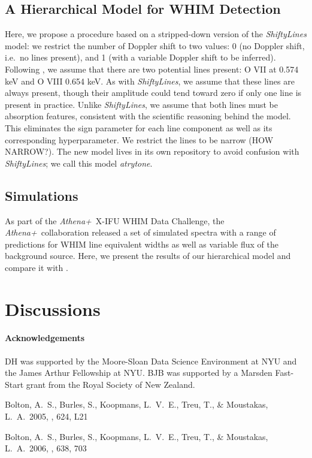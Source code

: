 \documentclass[12pt]{emulateapj}
\newcommand{\project}[1]{\textsl{#1}}
\newcommand{\athena}{\project{Athena+}}
\begin{document}
\subsection{A Hierarchical Model for WHIM Detection}

Here, we propose a procedure based on a stripped-down version of the \textit{ShiftyLines} model: we restrict the number of Doppler shift to two values: 0 (no Doppler shift, i.e.\ no lines present), and 1 (with a variable Doppler shift to be inferred). Following \citep{brand2016}, we assume that there are two potential lines present: O VII at 0.574 keV and O VIII 0.654 keV. As with \textit{ShiftyLines}, we assume that these lines are always present, though their amplitude could tend toward zero if only one line is present in practice. Unlike \textit{ShiftyLines}, we assume that both lines must be absorption features, consistent with the scientific reasoning behind the model. This eliminates the sign parameter for each line component as well as its corresponding hyperparameter. We restrict the lines to be narrow (HOW NARROW?). The new model lives in its own repository to avoid confusion with \textit{ShiftyLines}; we call this model \textit{atrytone}. 

\subsection{Simulations}

As part of the \athena\ X-IFU WHIM Data Challenge, the \athena\ collaboration released a set of simulated spectra with a range of predictions for WHIM line equivalent widths as well as variable flux of the background source. Here, we present the results of our hierarchical model and compare it with \citep{brand2016}.

\section{Discussions}



\paragraph{Acknowledgements}
DH was supported by the Moore-Sloan Data Science Environment at NYU and the James Arthur Fellowship at NYU.
BJB was supported by a Marsden Fast-Start grant from the Royal Society of
New Zealand.



\begin{thebibliography}{999}

 Bolton, A.~S., Burles, 
S., Koopmans, L.~V.~E., Treu, T., 
\& Moustakas, L.~A.\ 2005, \apjl, 624, L21 

 Bolton, A.~S., Burles, 
S., Koopmans, L.~V.~E., Treu, T., \& Moustakas, L.~A.\ 2006, \apj, 638, 703 

\end{thebibliography}
\end{document}
